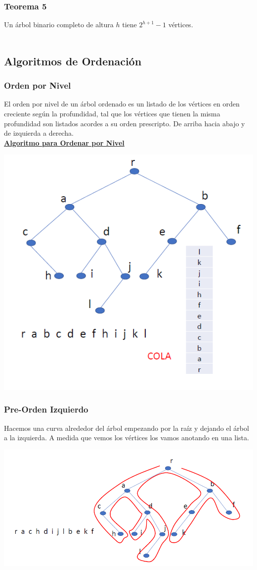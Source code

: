 \documentclass{article}
\newcommand{\bld}[1]{\textbf{#1}}
\begin{document}
\subsubsection{Teorema 5}
Un árbol binario completo de altura $h$ tiene $2^{h+1} - 1$ vértices.
\\\\

\subsection{Algoritmos de Ordenación}
\subsubsection{Orden por Nivel}
El orden por nivel de un árbol ordenado es un listado de los vértices en orden creciente según la
profundidad, tal que los vértices que tienen la misma profundidad son listados acordes a su orden prescripto. De
arriba hacia abajo y de izquierda a derecha.
\\\underline{\bld{Algoritmo para Ordenar por Nivel}}
\begin{center}
    \includegraphics[width=.50\textwidth]{algOrdenPorNivel.PNG}
\end{center}

\subsubsection{Pre-Orden Izquierdo}
Hacemos una curva alrededor del árbol empezando por la raíz y dejando el árbol a la izquierda. 
A medida que vemos los vértices los vamos anotando en una lista.
\begin{center}
    \includegraphics[width=.60\textwidth]{algPreordenIzq.PNG}
\end{center}
\end{document}
